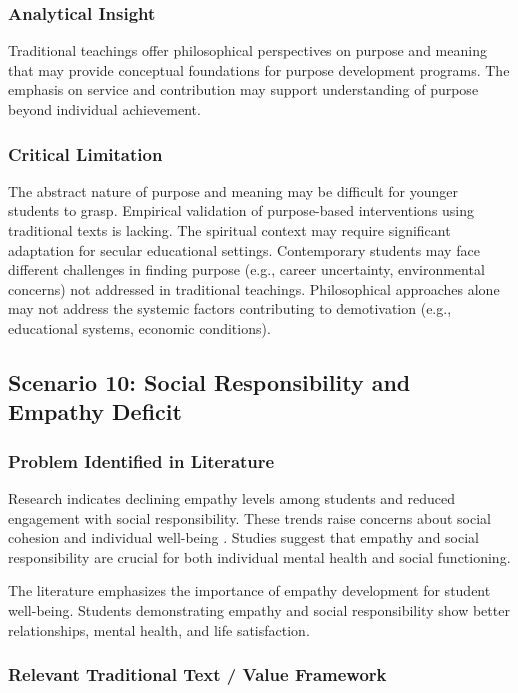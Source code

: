 \documentclass[12pt,a4paper,twocolumn]{article}
\begin{document}
\subsubsection{Analytical Insight}

Traditional teachings offer philosophical perspectives on purpose and meaning that may provide conceptual foundations for purpose development programs. The emphasis on service and contribution may support understanding of purpose beyond individual achievement.

\subsubsection{Critical Limitation}

The abstract nature of purpose and meaning may be difficult for younger students to grasp. Empirical validation of purpose-based interventions using traditional texts is lacking. The spiritual context may require significant adaptation for secular educational settings. Contemporary students may face different challenges in finding purpose (e.g., career uncertainty, environmental concerns) not addressed in traditional teachings. Philosophical approaches alone may not address the systemic factors contributing to demotivation (e.g., educational systems, economic conditions).

\subsection{Scenario 10: Social Responsibility and Empathy Deficit}

\subsubsection{Problem Identified in Literature}

Research indicates declining empathy levels among students and reduced engagement with social responsibility. These trends raise concerns about social cohesion and individual well-being \citep{Desai2020}. Studies suggest that empathy and social responsibility are crucial for both individual mental health and social functioning.

The literature emphasizes the importance of empathy development for student well-being. Students demonstrating empathy and social responsibility show better relationships, mental health, and life satisfaction.

\subsubsection{Relevant Traditional Text / Value Framework}
\end{document}
